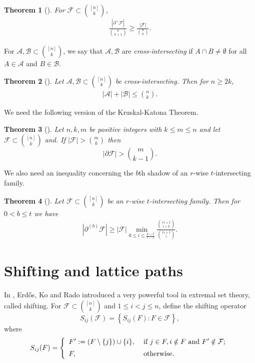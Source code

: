 \documentclass[11pt,a4paper]{article}
\newtheorem{thm}{Theorem}[section]
\newtheorem{false statement}{False statement}
\theoremstyle{definition}
\def\hf{\mathcal{F}}
\def\ha{\mathcal{A}}
\def\hb{\mathcal{B}}
\begin{document}
\begin{thm}[\cite{Sperner}]\label{thm-sperner}
 For $\hf\subset \binom{[n]}{k}$,
\begin{align}\label{ineq-sperner}
\frac{|\partial^+ \hf|}{\binom{n}{k+1}} \geq \frac{|\hf|}{\binom{n}{k}}.
\end{align}
\end{thm}

For $\ha,\hb\subset \binom{[n]}{k}$, we say that $\ha,\hb$ are {\it cross-intersecting} if $A\cap B\neq \emptyset$ for all $A\in \ha$ and $B\in \hb$. 

\begin{thm}[\cite{Hilton}]
Let $\ha,\hb\subset \binom{[n]}{k}$ be cross-intersecting. Then for $n\geq 2k$,
\begin{align}\label{ineq-1.7}
|\ha|+|\hb| \leq \binom{n}{k}.
\end{align}
\end{thm} 

We need the following version of the Kruskal-Katona Theorem.

\begin{thm}[\cite{Kruskal,Katona}]\label{thm-kk}
Let $n,k,m$ be positive integers with $k\leq m\leq n$ and let $\hf \subset \binom{[n]}{k}$  and. If $|\hf|>\binom{m}{k}$  then
\[
|\partial \hf|>\binom{m}{k-1}.
\]
\end{thm}

We also need an inequality concerning the $b$th shadow of an $r$-wise $t$-intersecting family. 

\begin{thm}[\cite{F91-2}]\label{thm-F91}
Let $\hf\subset \binom{[n]}{k}$ be an $r$-wise $t$-intersecting family. Then for $0<b\leq t$ we have
\begin{align}\label{ineq-key4}
|\partial^{(b)} \hf| \geq |\hf| \min_{0\leq i\leq \frac{k-t}{r-1}} \frac{\binom{ri+t}{i+b}}{\binom{ri+t}{i}}.
\end{align}
\end{thm}

\section{Shifting and lattice paths}


In \cite{ekr}, Erd\H{o}s, Ko and Rado introduced a very powerful tool in extremal set theory, called shifting.
For $\hf\subset \binom{[n]}{k}$ and $1\leq i<j\leq n$, define the shifting operator
$$S_{ij}(\hf)=\left\{S_{ij}(F)\colon F\in\hf\right\},$$
where
$$S_{ij}(F)=\left\{
                \begin{array}{ll}
                 F':= (F\setminus\{j\})\cup\{i\}, & \mbox{ if } j\in F, i\notin F \text{ and } F'\notin \hf; \\[5pt]
                  F, & \hbox{ otherwise.}
                \end{array}
              \right.
$$
\end{document}
